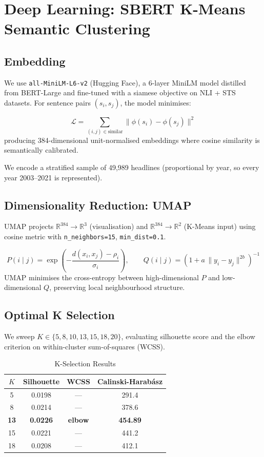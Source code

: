 \documentclass[12pt,a4paper]{article}
\begin{document}
\section{Deep Learning: SBERT K-Means Semantic Clustering}

\subsection{Embedding}

We use \texttt{all-MiniLM-L6-v2} (Hugging Face), a 6-layer MiniLM model distilled from
BERT-Large and fine-tuned with a siamese objective on NLI + STS datasets. For sentence
pairs $(s_i, s_j)$, the model minimises:

\begin{formulabox}
\[
\mathcal{L} = \sum_{(i,j) \in \text{similar}} \| \phi(s_i) - \phi(s_j) \|^2
\]
producing 384-dimensional unit-normalised embeddings where cosine similarity is
semantically calibrated.
\end{formulabox}

We encode a stratified sample of 49,989 headlines (proportional by year, so every
year 2003--2021 is represented).

\subsection{Dimensionality Reduction: UMAP}

UMAP projects $\mathbb{R}^{384} \to \mathbb{R}^3$ (visualisation) and
$\mathbb{R}^{384} \to \mathbb{R}^2$ (K-Means input) using cosine metric with
\texttt{n\_neighbors=15}, \texttt{min\_dist=0.1}.

\begin{formulabox}
\[
P(i \mid j) = \exp\!\left(-\frac{d(x_i, x_j) - \rho_i}{\sigma_i}\right),
\qquad
Q(i \mid j) = \left(1 + a\, \|y_i - y_j\|^{2b}\right)^{-1}
\]
UMAP minimises the cross-entropy between high-dimensional $P$ and low-dimensional $Q$,
preserving local neighbourhood structure.
\end{formulabox}

\subsection{Optimal K Selection}

We sweep $K \in \{5, 8, 10, 13, 15, 18, 20\}$, evaluating silhouette score and the
elbow criterion on within-cluster sum-of-squares (WCSS).

\begin{table}[H]
\centering
\caption{K-Selection Results}
\begin{tabular}{cccc}
\toprule
$K$ & Silhouette & WCSS & Calinski-Harabász \\
\midrule
5  & 0.0198 & — & 291.4 \\
8  & 0.0214 & — & 378.6 \\
\textbf{13} & \textbf{0.0226} & \textbf{elbow} & \textbf{454.89} \\
15 & 0.0221 & — & 441.2 \\
18 & 0.0208 & — & 412.1 \\
\bottomrule
\end{tabular}
\label{tab:k_selection}
\end{table}
\end{document}
